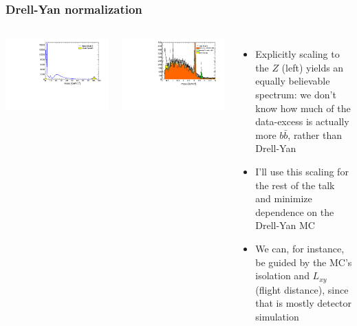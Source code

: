 \documentclass[compress]{beamer}
\begin{document}
\begin{frame}
\frametitle{Drell-Yan normalization}

\begin{columns}
\includegraphics[width=\linewidth]{normalizing_to_the_z.pdf}

\includegraphics[width=\linewidth]{lowdimuon_mass_nobcuts.pdf}

\begin{itemize}
\item Explicitly scaling to the $Z$ (left) yields an equally
  believable spectrum: we don't know how much of the data-excess is
  actually more $b\bar{b}$, rather than Drell-Yan
\item I'll use this scaling for the rest of the talk and minimize
  dependence on the Drell-Yan MC
\item We can, for instance, be guided by the MC's isolation and
  $L_{xy}$ (flight distance), since that is mostly detector simulation
\end{itemize}

\end{columns}
\end{frame}
\end{document}
